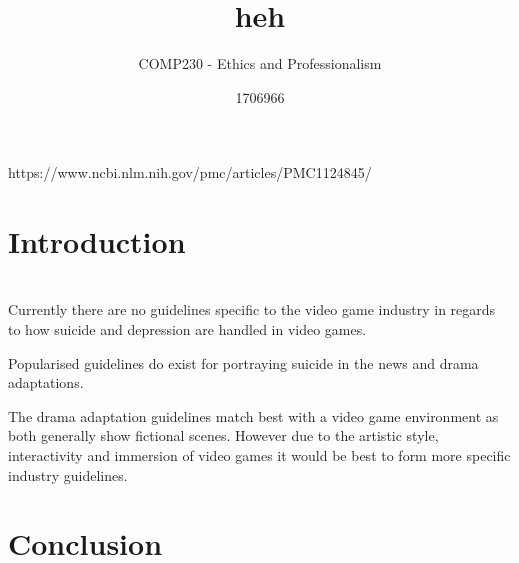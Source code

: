 \documentclass{scrartcl}
\title{heh}
\subtitle{COMP230 - Ethics and Professionalism}
\author{1706966}
\begin{document}
	
https://www.ncbi.nlm.nih.gov/pmc/articles/PMC1124845/	
	
	\maketitle
	
	\abstract{}
	
	\section{Introduction}
		
	
	\section{}
Currently there are no guidelines specific to the video game industry in regards to how suicide and depression are handled in video games.\vspace{5mm} %
	
	Popularised guidelines do exist for portraying suicide in the news\cite{world2017preventing}\cite{nepon2009media} and drama adaptations\cite{DramaGuidelines}. \vspace{5mm} %
	
	The drama adaptation guidelines match best with a video game environment as both generally show fictional scenes. However due to the artistic style, interactivity and immersion of video games it would be best to form more specific industry guidelines. 	
	
	\subsection{}
	
	\subsection{}
	
	\section{}
	
	\section{}
	
	\section{Conclusion}

	
	
	
\end{document}
